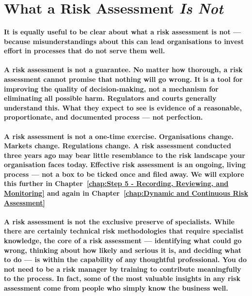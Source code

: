 \section{What a Risk Assessment \textbf{\textit{Is Not}}}

\paragraph{It is equally useful to be clear about what a risk assessment is not — because misunderstandings about this can lead organisations to invest effort in processes that do not serve them well.}

\paragraph{\textbf{A risk assessment is not a guarantee.} No matter how thorough, a risk assessment cannot promise that nothing will go wrong. It is a tool for improving the quality of decision-making, not a mechanism for eliminating all possible harm. Regulators and courts generally understand this. What they expect to see is evidence of a reasonable, proportionate, and documented process — not perfection.}

\paragraph{\textbf{A risk assessment is not a one-time exercise.} Organisations change. Markets change. Regulations change. A risk assessment conducted three years ago may bear little resemblance to the risk landscape your organisation faces today. Effective risk assessment is an ongoing, living process — not a box to be ticked once and filed away. We will explore this further in Chapter~\ref{chap:Step 5 - Recording, Reviewing, and Monitoring} and again in Chapter~\ref{chap:Dynamic and Continuous Risk Assessment}}

\paragraph{\textbf{A risk assessment is not the exclusive preserve of specialists.} While there are certainly technical risk methodologies that require specialist knowledge, the core of a risk assessment — identifying what could go wrong, thinking about how likely and serious it is, and deciding what to do — is within the capability of any thoughtful professional. You do not need to be a risk manager by training to contribute meaningfully to the process. In fact, some of the most valuable insights in any risk assessment come from people who simply know the business well.}

